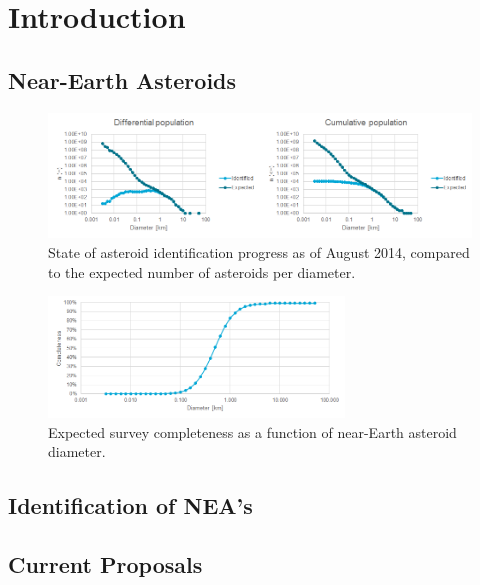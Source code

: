 \chapter{Introduction}

\section{Near-Earth Asteroids}

\begin{figure}[htbp]
 \centering
 \includegraphics[width=1.0\textwidth]{img/population_estimates.png}
 \caption{State of asteroid identification progress as of August 2014, compared to the expected number of asteroids per diameter. \cite{HarrisPopulation}}
 \label{fig:population_estimates}
\end{figure}

\begin{figure}[htbp]
 \centering
 \includegraphics[width=0.7\textwidth]{img/completeness_size.png}
 \caption{Expected survey completeness as a function of near-Earth asteroid diameter. \cite{HarrisPopulation}}
 \label{fig:completeness_size}
\end{figure}


\section{Identification of NEA's}

\section{Current Proposals}
